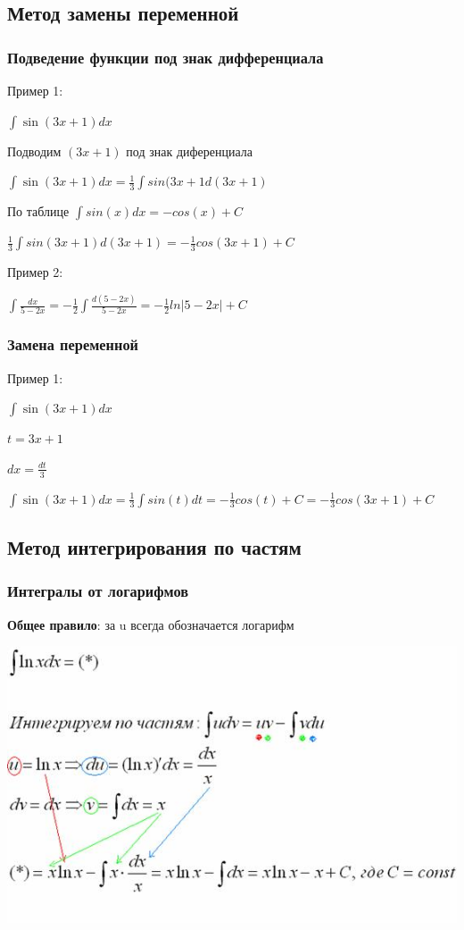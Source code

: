 \documentclass[12pt,a4paper]{article}
\begin{document}
\subsection{Метод замены переменной}
\subsubsection{Подведение функции под знак дифференциала}

Пример 1: 

$ \int{\sin(3x + 1)dx} $ 

Подводим $ (3x+1) $ под знак диференциала 

$ \int{\sin(3x + 1)dx} = \frac{1}{3}\int{sin(3x+1}d(3x+1) $ 

По таблице $ \int{sin(x)dx} = -cos(x) + C $ 

$ \frac{1}{3}\int{sin(3x+1)d(3x+1)} = -\frac{1}{3}cos(3x+1) + C $

Пример 2: 

$ \int{\frac{dx}{5 - 2x}} = -\frac{1}{2}\int{\frac{d(5-2x)}{5 - 2x}}
= -\frac{1}{2}ln|5-2x|+C $

\subsubsection{Замена переменной}
Пример 1: 

$ \int{\sin(3x + 1)dx} $ 

$ t = 3x + 1 $ 

$ dx = \frac{dt}{3} $ 

$ \int{\sin(3x + 1)dx} = \frac{1}{3}\int{sin(t)dt} = -\frac{1}{3}cos(t) + C = -\frac{1}{3}cos(3x+1) + C $ 

\subsection{Метод интегрирования по частям}
\subsubsection{Интегралы от логарифмов}
\textbf{Общее правило}: за u всегда обозначается логарифм

\includegraphics[width=\linewidth]{partial_integration}
\end{document}
